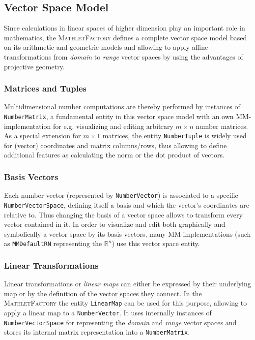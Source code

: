 \documentclass[a4paper,12pt]{article}
\newcommand{\name}[1]{\textsc{#1}}
\newcommand{\codename}[1]{\texttt{\small #1}}
\newcommand{\mf}{\name{MathletFactory }}
\begin{document}
\vspace{0.3cm}

\subsection{Vector Space Model}

Since calculations in linear spaces of higher dimension play an important role in mathematics, the \mf 
defines a complete vector space model based on its arithmetic and geometric models and allowing to apply affine 
transformations from \textit{domain} to \textit{range} vector spaces by using the advantages of projective 
geometry.

\subsubsection*{Matrices and Tuples}

Multidimensional number computations are thereby performed by instances of \codename{NumberMatrix},
a fundamental entity in this vector space model with an own MM-implementation for e.g. visualizing and
editing arbitrary $m\times n$ number matrices. As a special extension for $m\times 1$ matrices, the
entity \codename{NumberTuple} is widely used for (vector) coordinates and matrix columns/rows, thus 
allowing to define additional features as calculating the norm or the dot product of vectors.

\subsubsection*{Basis Vectors}

Each number vector (represented by \codename{NumberVector}) is associated to a specific \codename{NumberVectorSpace}, 
defining itself a basis and which the vector's coordinates are relative to. Thus changing the basis 
of a vector space allows to transform every vector contained in it.
In order to visualize and edit both graphically and symbolically a vector space by its basis vectors, 
many MM-implementations (such as \codename{MMDefaultRN} representing the $\mathbb{R}^n$) use this 
vector space entity.

\subsubsection*{Linear Transformations}

Linear transformations or \textit{linear maps} can either be expressed by their underlying map or by 
the definition of the vector spaces they connect. In the \mf the entity \codename{LinearMap} can be used
for this purpose, allowing to apply a linear map to a \codename{NumberVector}. It uses internally instances
of \codename{NumberVectorSpace} for representing the \textit{domain} and \textit{range} vector spaces and stores
its internal matrix representation into a \codename{NumberMatrix}.\\
\end{document}
